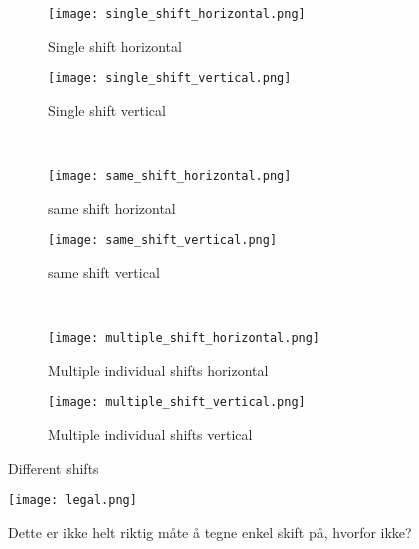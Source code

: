 \documentclass[../thesis.tex]{subfiles}
\begin{document}
\begin{figure}[h!]%
    \centering
    \begin{subfigure}{.47\textwidth}
        \centering
        \texttt{[image: single\_shift\_horizontal.png]}
        \caption{Single shift horizontal}
        \label{fig:single_shift_horizontal}
    \end{subfigure}\quad
    \begin{subfigure}{.47\textwidth}
        \centering
        \texttt{[image: single\_shift\_vertical.png]}
        \caption{Single shift vertical}
        \label{fig:single_shift_vertical}
    \end{subfigure}\\
    \begin{subfigure}{.47\textwidth}
        \centering
        \texttt{[image: same\_shift\_horizontal.png]}
        \caption{same shift horizontal}
        \label{fig:same_shift_horizontal}
    \end{subfigure}\quad
    \begin{subfigure}{.47\textwidth}
        \centering
        \texttt{[image: same\_shift\_vertical.png]}
        \caption{same shift vertical}
        \label{fig:same_shift_vertical}
    \end{subfigure}\\
    \begin{subfigure}{.47\textwidth}
        \centering
        \texttt{[image: multiple\_shift\_horizontal.png]}
        \caption{Multiple individual shifts horizontal}
        \label{fig:multiple_shift_horizontal}
    \end{subfigure}\quad
    \begin{subfigure}{.47\textwidth}
        \centering
        \texttt{[image: multiple\_shift\_vertical.png]}
        \caption{Multiple individual shifts vertical}
        \label{fig:multiple_shift_vertical}
    \end{subfigure}
    \caption{Different shifts}
    \label{fig:different_shifts}
\end{figure}

\begin{figure}[]%
    \centering
    \texttt{[image: legal.png]}
    \caption{Dette er ikke helt riktig måte å tegne enkel skift på, hvorfor ikke?}
    \label{fig:not_allowed}
\end{figure}
\end{document}
